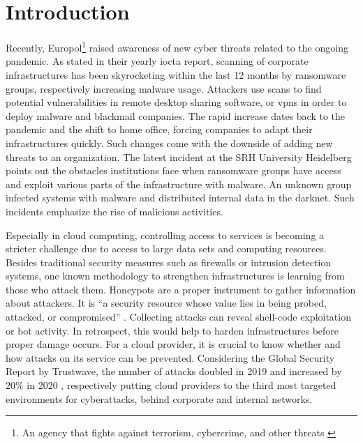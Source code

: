 \chapter{Introduction}

Recently, Europol\footnote{An agency that fights against terrorism, cybercrime, and other threats \cite{europol2021}} raised awareness of new cyber threats related to the ongoing pandemic.
As stated in their yearly \ac{iocta} report, scanning of corporate infrastructures has been skyrocketing within the last 12 months by ransomware groups, respectively increasing malware usage.
Attackers use scans to find potential vulnerabilities in remote desktop sharing software, or \acp{vpn} in order to deploy malware and blackmail companies. \cite{iocta2020}
The rapid increase dates back to the pandemic and the shift to home office, forcing companies to adapt their infrastructures quickly.
Such changes come with the downside of adding new threats to an organization.
The latest incident at the SRH University Heidelberg points out the obstacles institutions face when ransomware groups have access and exploit various parts of the infrastructure with malware.
An unknown group infected systems with malware and distributed internal data in the darknet.
Such incidents emphasize the rise of malicious activities.

Especially in cloud computing, controlling access to services is becoming a stricter challenge due to access to large data sets and computing resources.
Besides traditional security measures such as firewalls or intrusion detection systems, one known methodology to strengthen infrastructures is learning from those who attack them.
Honeypots are a proper instrument to gather information about attackers.
It is \enquote{a security resource whose value lies in being probed, attacked, or compromised} \cite{Spitzner2003}.
Collecting attacks can reveal shell-code exploitation or bot activity.
In retrospect, this would help to harden infrastructures before proper damage occurs.
For a cloud provider, it is crucial to know whether and how attacks on its service can be prevented.
Considering the Global Security Report by Trustwave, the number of attacks doubled in 2019 and increased by $20\%$ in 2020 \cite{fahim2020}, respectively putting cloud providers to the third most targeted environments for cyberattacks, behind corporate and internal networks.

